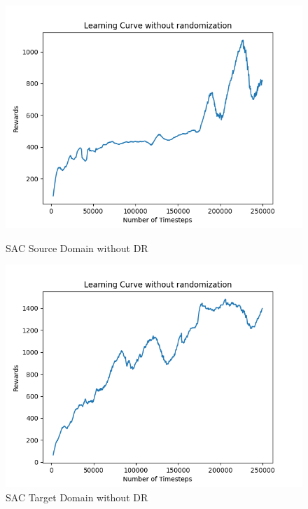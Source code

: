 \documentclass[11pt]{article}
\begin{document}
\begin{figure}[H]
    \centering
    \begin{minipage}{0.45\textwidth}
        \centering
        \includegraphics[width=\textwidth]{../images/Learning_Curve_SAC_no_rand_Source.png}
        \caption{SAC Source Domain without DR}
        \label{fig:sac_source_no_dr}
    \end{minipage}
    \hfill
    \begin{minipage}{0.45\textwidth}
        \centering
        \includegraphics[width=\textwidth]{../images/Learning_Curve_SAC_no_rand_Target.png}
        \caption{SAC Target Domain without DR}
        \label{fig:sac_target_no_dr}
    \end{minipage}

\end{figure}
\end{document}
